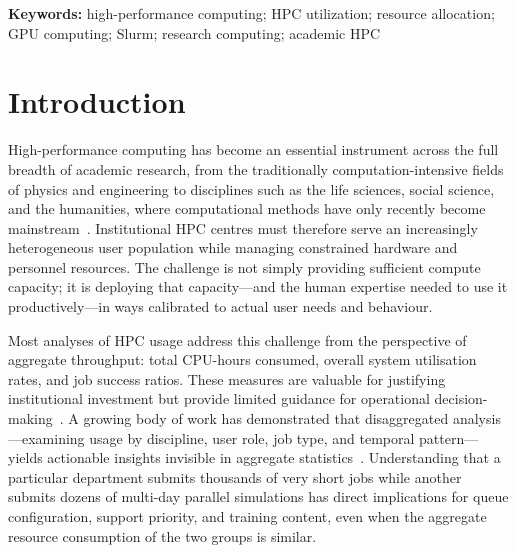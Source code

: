 \documentclass[11pt,letterpaper]{article}
\begin{document}
\begin{titlepage}
  \vspace{0.6cm}
  \noindent\textbf{Keywords:} high-performance computing; HPC utilization;
  resource allocation; GPU computing; Slurm; research computing; academic HPC

\end{titlepage}

\setcounter{page}{1}

\section{Introduction}
\label{sec:intro}

High-performance computing has become an essential instrument across the full
breadth of academic research, from the traditionally computation-intensive fields
of physics and engineering to disciplines such as the life sciences, social
science, and the humanities, where computational methods have only recently
become mainstream~\citep{smith2022,nsf2007}.  Institutional HPC centres must
therefore serve an increasingly heterogeneous user population while managing
constrained hardware and personnel resources.  The challenge is not simply
providing sufficient compute capacity; it is deploying that capacity---and the
human expertise needed to use it productively---in ways calibrated to actual
user needs and behaviour.

Most analyses of HPC usage address this challenge from the perspective of aggregate
throughput: total CPU-hours consumed, overall system utilisation rates, and job
success ratios.  These measures are valuable for justifying institutional investment
but provide limited guidance for operational decision-making~\citep{cahill2014,vonlaszewski2012}.
A growing body of work has demonstrated that disaggregated analysis---examining
usage by discipline, user role, job type, and temporal pattern---yields actionable
insights invisible in aggregate statistics~\citep{furlani2013,simakov2018}.
Understanding that a particular department submits thousands of very short jobs
while another submits dozens of multi-day parallel simulations has direct
implications for queue configuration, support priority, and training content,
even when the aggregate resource consumption of the two groups is similar.
\end{document}
